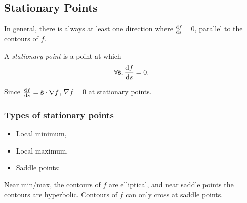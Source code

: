 \documentclass[10pt]{article}
\begin{document}
    \subsection{Stationary Points}
    In general, there is always at least one direction where $ \frac{\mathrm{d}f}{\mathrm{d}s}=0 $, parallel to the contours of $f$.
    \begin{definition}
        A \textit{stationary point} is a point at which 
        \[
            \forall \hat{{\bf s}}, \frac{\mathrm{d}f}{\mathrm{d}s}=0. 
        \]
    \end{definition}
    Since $ \frac{\mathrm{d}f}{\mathrm{d}s}=\hat{{\bf s}}\cdot \nabla f $, $ \nabla f=0 $ at stationary points.
    \subsubsection*{Types of stationary points}
    \begin{itemize}
        \item Local minimum,
        \item Local maximum,
        \item Saddle points:
        \begin{center}
          \end{center}
    \end{itemize}
    \begin{remark}
        Near min/max, the contours of $f$ are elliptical, and near saddle points the contours are hyperbolic. Contours of $f$ can only cross at saddle points.
    \end{remark}
\end{document}
